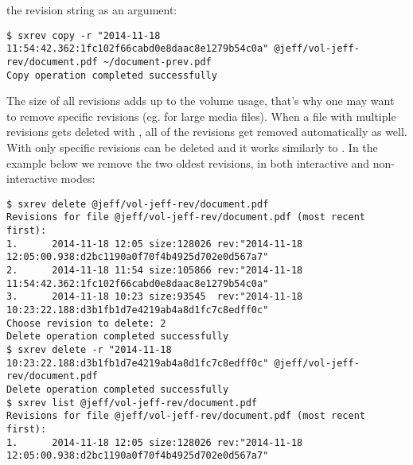 the revision string as an argument:
\begin{lstlisting}
$ sxrev copy -r "2014-11-18 11:54:42.362:1fc102f66cabd0e8daac8e1279b54c0a" @jeff/vol-jeff-rev/document.pdf ~/document-prev.pdf
Copy operation completed successfully
\end{lstlisting}
The size of all revisions adds up to the volume usage, that's why one may want
to remove specific revisions (eg. for large media files). When a file with
multiple revisions gets deleted with , all of the revisions get
removed automatically as well. With  only specific revisions
can be deleted and it works similarly to . In the example
below we remove the two oldest revisions, in both interactive and
non-interactive modes:
\begin{lstlisting}
$ sxrev delete @jeff/vol-jeff-rev/document.pdf
Revisions for file @jeff/vol-jeff-rev/document.pdf (most recent first):
1.      2014-11-18 12:05 size:128026 rev:"2014-11-18 12:05:00.938:d2bc1190a0f70f4b4925d702e0d567a7"
2.      2014-11-18 11:54 size:105866 rev:"2014-11-18 11:54:42.362:1fc102f66cabd0e8daac8e1279b54c0a"
3.      2014-11-18 10:23 size:93545  rev:"2014-11-18 10:23:22.188:d3b1fb1d7e4219ab4a8d1fc7c8edff0c"
Choose revision to delete: 2
Delete operation completed successfully
$ sxrev delete -r "2014-11-18 10:23:22.188:d3b1fb1d7e4219ab4a8d1fc7c8edff0c" @jeff/vol-jeff-rev/document.pdf
Delete operation completed successfully
$ sxrev list @jeff/vol-jeff-rev/document.pdf
Revisions for file @jeff/vol-jeff-rev/document.pdf (most recent first):
1.      2014-11-18 12:05 size:128026 rev:"2014-11-18 12:05:00.938:d2bc1190a0f70f4b4925d702e0d567a7"
\end{lstlisting}
